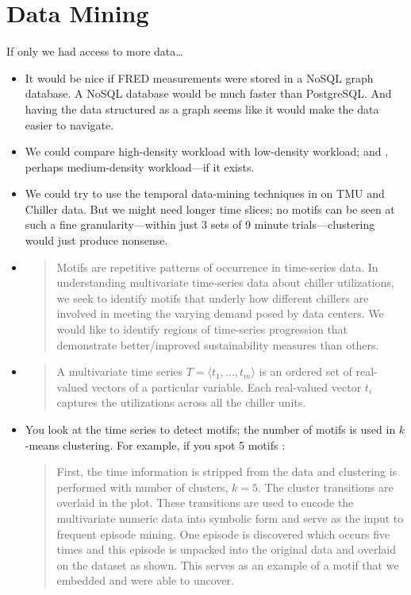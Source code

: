 \documentclass[10pt]{report}
\begin{document}
 \section{Data Mining}
 If only we had access to more data\dots
 \begin{itemize}
   \item It would be nice if FRED measurements were stored in a NoSQL graph database. A NoSQL database would be much faster than PostgreSQL. And having the data structured as a graph seems like it would make the data easier to navigate.
   \item We could compare high-density workload with low-density workload; and , perhaps medium-density workload---if it exists.
    \item We could try to use the temporal data-mining techniques in \cite{Patnaik2009,Patnaik2011} on TMU and Chiller data. But we might need longer time slices; no motifs can be seen at such a fine granularity---within just 3 sets of 9 minute trials---clustering would just produce nonsense.
   \item \cite[p. :7]{Patnaik2011}
     \begin{quote}
Motifs are repetitive patterns of occurrence in time-series data. In understanding multivariate time-series data about chiller utilizations, we seek to identify motifs that underly how different chillers are involved in meeting the varying demand posed by data centers. We would like to identify regions of time-series progression that demonstrate better/improved sustainability measures than others.
     \end{quote}
   \item \cite[pp.--1309]{Patnaik2009}
 \begin{quote} 
   A multivariate time series $T = \langle t_1,\dots, t_m\rangle$ is an ordered set of real-valued vectors of a particular variable. Each real-valued vector $t_i$ captures the utilizations across all the chiller units.
 \end{quote}
 \item You look at the time series to detect motifs; the number of motifs is used in $k$-means clustering. For example, if you spot 5 motifs \cite[p. :12]{Patnaik2011}:
   \begin{quote}
     First, the time information is stripped from the data and clustering is performed with number of clusters, $k = 5$. The cluster transitions are overlaid in the plot. These transitions are used to encode the multivariate numeric data into symbolic form and serve as the input to frequent episode mining. One episode is discovered which occurs five times and this episode is unpacked into the original data and overlaid on the dataset as shown. This serves as an example of a motif that we embedded and were able to uncover.

\end{quote}
\end{itemize}
\end{document}

